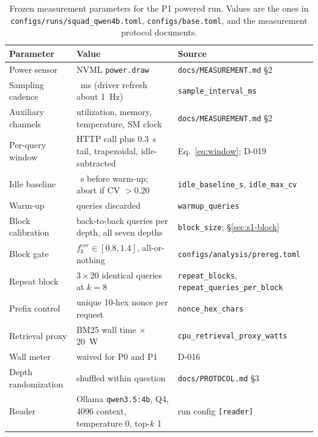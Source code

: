 \begin{table}[pos=htbp]
  \centering
  \caption{Frozen measurement parameters for the P1 powered run. Values are the ones in
  \texttt{configs/runs/squad\_qwen4b.toml}, \texttt{configs/base.toml}, and the measurement
  protocol documents.}
  \label{tab:params}
  \begin{tabularx}{\textwidth}{>{\raggedright\arraybackslash}p{4.1cm}>{\raggedright\arraybackslash}p{5.6cm}X}
    \toprule
    \textbf{Parameter} & \textbf{Value} & \textbf{Source} \\
    \midrule
    Power sensor & NVML \texttt{power.draw} & \texttt{docs/MEASUREMENT.md} \S2 \\
    Sampling cadence & 100~ms (driver refresh about 1~Hz) & \texttt{sample\_interval\_ms} \\
    Auxiliary channels & utilization, memory, temperature, SM clock & \texttt{docs/MEASUREMENT.md} \S2 \\
    Per-query window & HTTP call plus 0.3~s tail, trapezoidal, idle-subtracted & Eq.~\ref{eq:window}; D-019 \\
    Idle baseline & 60~s before warm-up; abort if CV $>0.20$ & \texttt{idle\_baseline\_s}, \texttt{idle\_max\_cv} \\
    Warm-up & 20 queries discarded & \texttt{warmup\_queries} \\
    Block calibration & 20 back-to-back queries per depth, all seven depths & \texttt{block\_size}; \S\ref{sec:s1-block} \\
    Block gate & $f^{\mathrm{csv}}_k\in[0.8,1.4]$, all-or-nothing & \texttt{configs/analysis/prereg.toml} \\
    Repeat block & $3\times20$ identical queries at $k=8$ & \texttt{repeat\_blocks}, \texttt{repeat\_queries\_per\_block} \\
    Prefix control & unique 10-hex nonce per request & \texttt{nonce\_hex\_chars} \\
    Retrieval proxy & BM25 wall time $\times$ 20~W & \texttt{cpu\_retrieval\_proxy\_watts} \\
    Wall meter & waived for P0 and P1 & D-016 \\
    Depth randomization & shuffled within question & \texttt{docs/PROTOCOL.md} \S3 \\
    Reader & Ollama \texttt{qwen3.5:4b}, Q4, 4096 context, temperature 0, top-$k$ 1 & run config \texttt{[reader]} \\
    \bottomrule
  \end{tabularx}
\end{table}

